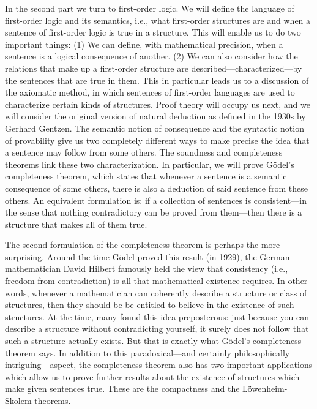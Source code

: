 In the second part we turn to first-order logic.  We will define the
language of first-order logic and its semantics, i.e., what first-order
structures are and when a sentence of first-order logic is true in a
structure.  This will enable us to do two important things: (1) We can
define, with mathematical precision, when a sentence is a logical
consequence of another.  (2) We can also consider how the relations
that make up a first-order structure are
described---characterized---by the sentences that are true in them.
This in particular leads us to a discussion of the axiomatic method,
in which sentences of first-order languages are used to characterize
certain kinds of structures.  Proof theory will occupy us next, and we
will consider the original version of natural deduction as defined in
the 1930s by Gerhard Gentzen.  The semantic notion of consequence and
the syntactic notion of provability give us two completely different
ways to make precise the idea that a sentence may follow from some
others. The soundness and completeness theorems link these two
characterization. In particular, we will prove G\"odel's completeness
theorem, which states that whenever a sentence is a semantic
consequence of some others, there is also a deduction of said sentence
from these others.  An equivalent formulation is: if a collection of
sentences is consistent---in the sense that nothing contradictory can
be proved from them---then there is a structure that makes all of them
true.

The second formulation of the completeness theorem is perhaps the more
surprising. Around the time G\"odel proved this result (in 1929), the
German mathematician David Hilbert famously held the view that
consistency (i.e., freedom from contradiction) is all that mathematical
existence requires.  In other words, whenever a mathematician can
coherently describe a structure or class of structures, then they
should be be entitled to believe in the existence of such structures.
At the time, many found this idea preposterous: just because you can
describe a structure without contradicting yourself, it surely does
not follow that such a structure actually exists.  But that is exactly
what G\"odel's completeness theorem says.  In addition to this
paradoxical---and certainly philosophically intriguing---aspect, the
completeness theorem also has two important applications which allow
us to prove further results about the existence of structures which
make given sentences true.  These are the compactness and the
L\"owenheim-Skolem theorems.

